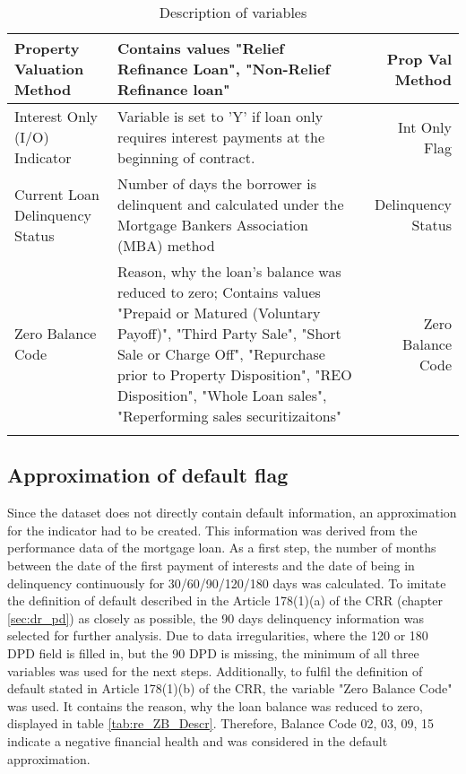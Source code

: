 \begin{longtable}{ Lp{8cm}R }
Property Valuation Method                 & Contains values "Relief Refinance Loan", "Non-Relief Refinance loan"                                                                                                                                                                                                                 & Prop Val Method    \\\hline
Interest Only (I/O) Indicator             & Variable is set to 'Y' if loan only requires interest payments at the beginning of contract.                                                                                                                                                                                         & Int Only Flag      \\\hline
Current Loan Delinquency Status           & Number of days the borrower is delinquent and calculated under the Mortgage Bankers Association (MBA) method                                                                                                                                                                         & Delinquency Status \\\hline
Zero Balance Code                         & Reason, why the loan's balance was reduced to zero; Contains values "Prepaid or Matured (Voluntary Payoff)", "Third Party Sale", "Short Sale or Charge Off", "Repurchase prior to Property Disposition", "REO Disposition", "Whole Loan sales", "Reperforming sales securitizaitons" & Zero Balance Code 
\\\bottomrule

\caption{Description of variables}
\label{tab:re_descr}
\end{longtable}

\subsection{Approximation of default flag}
\label{sec:aprox_def}

Since the dataset does not directly contain default information, an approximation for the indicator had to be created. This information was derived from the performance data of the mortgage loan. As a first step, the number of months between the date of the first payment of interests and the date of being in delinquency continuously for 30/60/90/120/180 days was calculated. To imitate the definition of default described in the Article 178(1)(a) of the CRR (chapter \ref{sec:dr_pd}) as closely as possible, the 90 days delinquency information was selected for further analysis. Due to data irregularities, where the 120 or 180 DPD field is filled in, but the 90 DPD is missing, the minimum of all three variables was used for the next steps. Additionally, to fulfil the definition of default stated in Article 178(1)(b) of the CRR, the variable "Zero Balance Code" was used. It contains the reason, why the loan balance was reduced to zero, displayed in table \ref{tab:re_ZB_Descr}. Therefore, Balance Code 02, 03, 09, 15 indicate a negative financial health and was considered in the default approximation.

